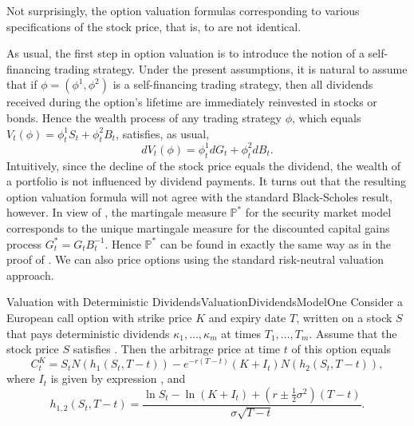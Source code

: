 Not surprisingly, the option valuation formulas corresponding to various specifications of the stock price, that is, to  are not identical.

As usual, the first step in option valuation is to introduce the notion of a self-financing trading strategy. Under the present assumptions, it is natural to assume that if \(\phi = (\phi^1, \phi^2)\) is a self-financing trading strategy, then all dividends received during the option's lifetime are immediately reinvested in stocks or bonds. Hence the wealth process of any trading strategy \(\phi\), which equals \(V_t(\phi) = \phi_t^1 S_t + \phi_t^2 B_t\), satisfies, as usual,
\begin{equation}
	dV_t(\phi) = \phi_t^1 dG_t + \phi_t^2 dB_t.
	\label{eq:WealthProcessDividends}
\end{equation}
Intuitively, since the decline of the stock price equals the dividend, the wealth of a portfolio is not influenced by dividend payments. It turns out that the resulting option valuation formula will not agree with the standard Black-Scholes result, however. In view of , the martingale measure \(\mathbb{P}^*\) for the security market model corresponds to the unique martingale measure for the discounted capital gains process \(G_t^* = G_t B_t^{-1}\). Hence \(\mathbb{P}^*\) can be found in exactly the same way as in the proof of . We can also price options using the standard risk-neutral valuation approach.

\begin{prop}{Valuation with Deterministic Dividends}{ValuationDividendsModelOne}
	Consider a European call option with strike price \(K\) and expiry date \(T\), written on a stock \(S\) that pays deterministic dividends \(\kappa_1, \dots, \kappa_m\) at times \(T_1, \dots, T_m\). Assume that the stock price \(S\) satisfies . Then the arbitrage price at time \(t\) of this option equals
	\begin{equation}
		C_t^K = S_t N(h_1(S_t, T-t)) - e^{-r(T-t)}(K + I_t)N(h_2(S_t, T-t)),
		\label{eq:CallPriceModelOne}
	\end{equation}
	where \(I_t\) is given by expression , and
	\begin{equation}
		h_{1,2}(S_t, T-t) = \frac{\ln S_t - \ln(K + I_t) + (r \pm \frac{1}{2}\sigma^2)(T-t)}{\sigma\sqrt{T-t}}.
		\label{eq:d1d2ModelOne}
	\end{equation}
\end{prop}

